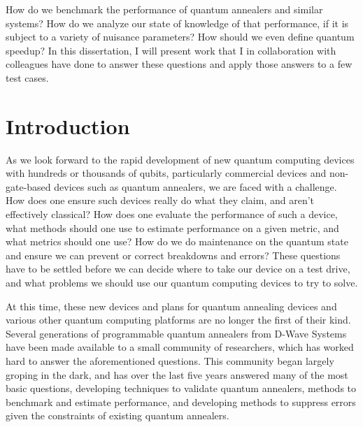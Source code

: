
How do we benchmark the performance of quantum annealers and similar systems? How do we analyze our state of knowledge of that performance, if it is subject to a variety of nuisance parameters? How should we even define quantum speedup? In this dissertation, I will present work that I in collaboration with colleagues have done to answer these questions and apply those answers to a few test cases.

\section{Introduction}
As we look forward to the rapid development of new quantum computing devices with hundreds or thousands of qubits, particularly commercial devices and non-gate-based devices such as quantum annealers, we are faced with a
challenge. How does one ensure such devices really do what they claim, and aren't effectively classical? How does one evaluate the performance of such a device, what methods should one use to estimate performance on a given metric, and what metrics should one use? How do we do maintenance on the quantum state and ensure we can prevent or correct breakdowns and errors? These questions have to be settled before we can decide where to take our device on a test drive,
and what problems we should use our quantum computing devices to try to solve.

At this time, these new devices and plans for quantum annealing devices and various other quantum computing platforms are no longer the first of their kind. Several generations of programmable quantum annealers from D-Wave Systems have been made available to a small community of researchers, which has worked hard to answer the aforementioned questions. This community began largely groping in the dark, and has over the last five years answered many of the most basic questions, developing techniques to validate quantum annealers, methods to benchmark and estimate performance, and developing methods to suppress errors given the constraints of existing quantum annealers.

